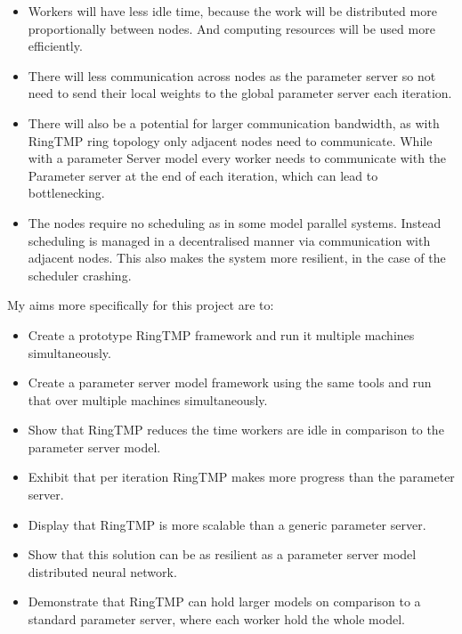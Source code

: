 \begin{itemize}
    \item Workers will have less idle time, because the work will be distributed
    more proportionally between nodes. And computing resources will be used more
    efficiently.
    \item There will less communication across nodes as the parameter server so
    not need to send their local weights to the global parameter server each
    iteration.
    \item There will also be a potential for larger communication bandwidth, as
    with RingTMP ring topology only adjacent nodes need to communicate. While
    with a parameter Server model every worker needs to communicate with the
    Parameter server at the end of each iteration, which can lead to
    bottlenecking.
    \item The nodes require no scheduling as in some model parallel systems.
    Instead scheduling is managed in a decentralised manner via communication
    with adjacent nodes. This also makes the system more resilient, in the case
    of the scheduler crashing.


\end{itemize}

My aims more specifically for this project are to:
\begin{itemize}
    \item Create a prototype RingTMP framework and run it multiple machines
    simultaneously.
    \item Create a parameter server model framework using the same tools and run
    that over multiple machines simultaneously.
    \item Show that RingTMP reduces the time workers are idle in comparison to
    the parameter server model.
    \item Exhibit that per iteration RingTMP makes more progress than the parameter
    server.
    \item Display that RingTMP is more scalable than a generic parameter server.
    \item Show that this solution can be as resilient as a parameter server
    model distributed neural network.
    \item Demonstrate that RingTMP can hold larger models on comparison to a
    standard parameter server, where each worker hold the whole model.
\end{itemize}



